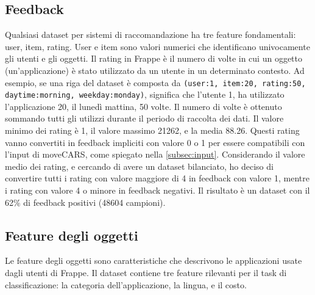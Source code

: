 \documentclass[12pt,italian]{report}
\begin{document}
\subsection{Feedback}
Qualsiasi dataset per sistemi di raccomandazione ha tre feature fondamentali: user, item, rating. User e item sono valori numerici che identificano univocamente gli utenti e gli oggetti. Il rating in Frappe è il numero di volte in cui un oggetto (un'applicazione) è stato utilizzato da un utente in un determinato contesto. Ad esempio, se una riga del dataset è composta da \texttt{(user:1, item:20, rating:50, daytime:morning, weekday:monday)}, significa che l'utente 1, ha utilizzato l'applicazione 20, il lunedì mattina, 50 volte. Il numero di volte è ottenuto sommando tutti gli utilizzi durante il periodo di raccolta dei dati. Il valore minimo dei rating è 1, il valore massimo 21262, e la media 88.26. Questi rating vanno convertiti in feedback impliciti con valore 0 o 1 per essere compatibili con l'input di moveCARS, come spiegato nella \autoref{subsec:input}. Considerando il valore medio dei rating, e cercando di avere un dataset bilanciato, ho deciso di convertire tutti i rating con valore maggiore di 4 in feedback con valore 1, mentre i rating con valore 4 o minore in feedback negativi. Il risultato è un dataset con il 62\% di feedback positivi (48604 campioni).

\subsection{Feature degli oggetti}
Le feature degli oggetti sono caratteristiche che descrivono le applicazioni usate dagli utenti di Frappe. Il dataset contiene tre feature rilevanti per il task di classificazione: la categoria dell'applicazione, la lingua, e il costo.
\end{document}
